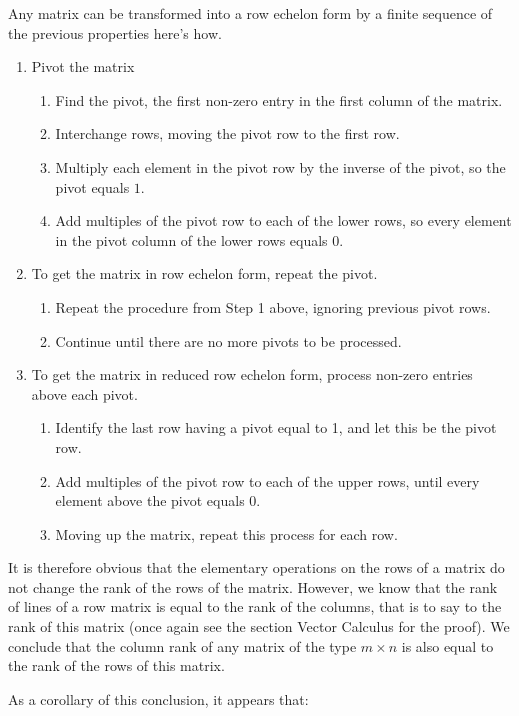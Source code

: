 	Any matrix can be transformed into a row echelon form by a finite sequence of the previous properties here's how.
	\begin{enumerate}
		\item Pivot the matrix
		\begin{enumerate}
			\item Find the pivot, the first non-zero entry in the first column of the matrix.
			\item Interchange rows, moving the pivot row to the first row.
			\item Multiply each element in the pivot row by the inverse of the pivot, so the pivot equals $1$.
			\item Add multiples of the pivot row to each of the lower rows, so every element in the pivot column of the lower rows equals $0$.				
		\end{enumerate}
		\item To get the matrix in row echelon form, repeat the pivot.
		\begin{enumerate}
			\item Repeat the procedure from Step 1 above, ignoring previous pivot rows.
			\item Continue until there are no more pivots to be processed.
		\end{enumerate}
		\item To get the matrix in reduced row echelon form, process non-zero entries above each pivot.
		\begin{enumerate}
			\item Identify the last row having a pivot equal to 1, and let this be the pivot row.
			\item Add multiples of the pivot row to each of the upper rows, until every element above the pivot equals $0$.
			\item Moving up the matrix, repeat this process for each row.
		\end{enumerate}
	\end{enumerate}
	It is therefore obvious that the elementary operations on the rows of a matrix do not change the rank of the rows of the matrix. However, we know that the rank of lines of a row matrix is equal to the rank of the columns, that is to say to the rank of this matrix (once again see the section Vector Calculus for the proof). We conclude that the column rank of any matrix of the type $m\times n$ is also equal to the rank of the rows of this matrix.
	
	As a corollary of this conclusion, it appears that:
	
